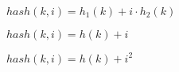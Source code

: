 \documentclass{article}
\begin{document}
$hash(k,i) = h_1(k)+i\cdot h_2(k)$
\pagebreak

$hash(k,i) = h(k)+i$
\pagebreak

$hash(k,i) = h(k)+i^2$
\pagebreak
\end{document}
